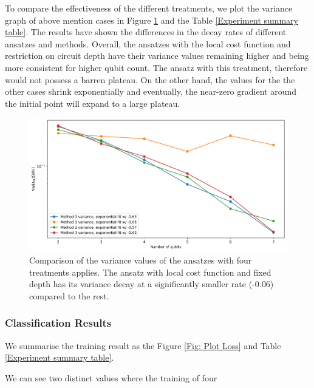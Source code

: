 To compare the effectiveness of the different treatments, we plot the variance graph of above mention cases in Figure \ref{Fig: Plot Variances} and the Table \ref{Experiment summary table}.
The results have shown the differences in the decay rates of different ansatzes and methods.
Overall, the ansatzes with the local cost function and restriction on circuit depth have their variance values remaining higher and being more consistent for higher qubit count.
The ansatz with this treatment, therefore would not possess a barren plateau.
On the other hand, the values for the the other cases shrink exponentially and eventually, the near-zero gradient around the initial point will expand to a large plateau.


\begin{figure}
    \includegraphics[width=\textwidth]{Artefact/Appendices/variances.png}
    \caption{
        Comparison of the variance values of the ansatzes with four treatments applies.
        The ansatz with local cost function and fixed depth has its variance decay at a significantly smaller rate (-0.06) compared to the rest.
    }
    \label{Fig: Plot Variances}
\end{figure}


\subsubsection{Classification Results}
We summarise the training result as the Figure \ref{Fig: Plot Loss} and Table \ref{Experiment summary table}.

We can see two distinct values where the training of four

